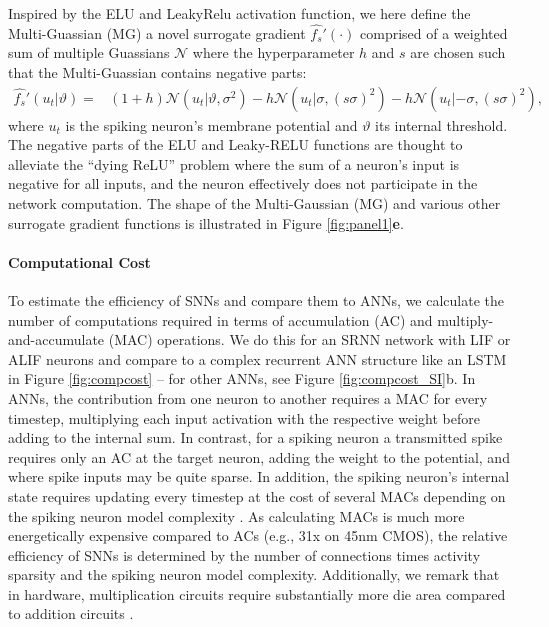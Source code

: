 \documentclass[fleqn,10pt]{wlscirep}
\begin{document}
Inspired by the ELU\cite{clevert2015fast} and LeakyRelu\cite{} activation function, we here define the Multi-Guassian (MG) a novel surrogate gradient $\hat{f_s}'(\cdot)$ comprised of a weighted sum of multiple Guassians $\mathcal{N}$ where the hyperparameter $h$ and $s$ are chosen such that the Multi-Guassian contains negative parts:
\begin{align}
\hat{f_s}'(u_{t}|\vartheta) = &  (1+h)\mathcal{N}(u_t|\vartheta,\sigma^2) - h\mathcal{N}(u_t|\sigma,(s \sigma)^2) -  h\mathcal{N}(u_t|-\sigma,(s \sigma)^2),    
\end{align}
where $u_t$ is the spiking neuron's membrane potential and $\vartheta$ its internal threshold. 
The negative parts of the ELU and Leaky-RELU functions are thought to alleviate the ``dying ReLU'' problem \cite{lu2019dying} where the sum of a neuron's input is negative for all inputs, and the neuron effectively does not participate in the network computation. The shape of the Multi-Gaussian (MG) and various other surrogate gradient functions is illustrated in Figure \ref{fig:panel1}\textbf{e}.  





\paragraph{Computational Cost} To estimate the efficiency of SNNs and compare them to ANNs, we calculate the number of computations required in terms of accumulation (AC) and multiply-and-accumulate (MAC) operations\cite{wong2020tinyspeech}. We do this for an SRNN network with LIF or ALIF neurons and compare to a complex recurrent ANN structure like an LSTM\cite{hochreiter1997long} in Figure \ref{fig:compcost} -- for other ANNs, see Figure \ref{fig:compcost_SI}b.
In ANNs, the contribution from one neuron to another requires a MAC for every timestep, multiplying each input activation with the respective weight before adding to the internal sum. In contrast, for a spiking neuron a transmitted spike requires only an AC at the target neuron, adding the weight to the potential, and where spike inputs may be quite sparse. In addition, the spiking neuron's internal state requires updating every timestep at the cost of several MACs depending on the spiking neuron model complexity \cite{roy2019towards}. As calculating MACs is much more energetically expensive compared to ACs (e.g., 31x on 45nm CMOS\cite{horowitz20141}), the relative efficiency of SNNs is determined by the number of connections times activity sparsity and the spiking neuron model complexity.  Additionally, we remark that in hardware, multiplication circuits require substantially more die area compared to addition circuits \cite{ludgate1982proposed}.  
\end{document}
